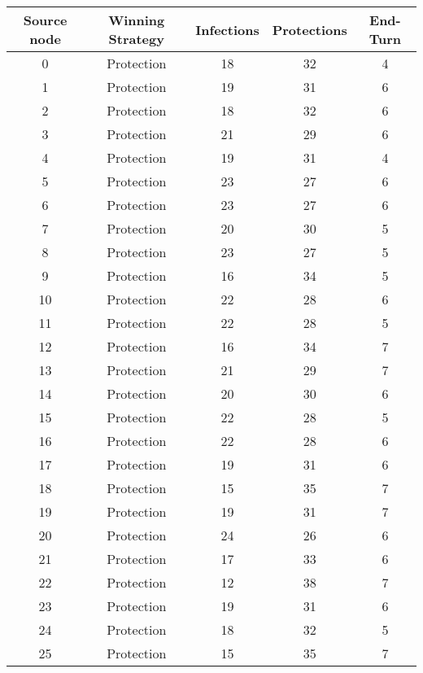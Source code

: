 \documentclass[results.tex]{subfiles}
\begin{document}
\begin{center}
  \begin{tabular}{| c || c | c | c | c |}
    \hline
    {\bfseries Source node} & {\bfseries Winning Strategy} & {\bfseries Infections} & {\bfseries Protections} & {\bfseries End-Turn} \\  %
    \hline\hline
    0 & Protection & 18 & 32 & 4 \\ 
    \hline
    1 & Protection & 19 & 31 & 6 \\ 
    \hline
    2 & Protection & 18 & 32 & 6 \\ 
    \hline
    3 & Protection & 21 & 29 & 6 \\ 
    \hline
    4 & Protection & 19 & 31 & 4 \\ 
    \hline
    5 & Protection & 23 & 27 & 6 \\ 
    \hline
    6 & Protection & 23 & 27 & 6 \\ 
    \hline
    7 & Protection & 20 & 30 & 5 \\ 
    \hline
    8 & Protection & 23 & 27 & 5 \\ 
    \hline
    9 & Protection & 16 & 34 & 5 \\ 
    \hline
    10 & Protection & 22 & 28 & 6 \\ 
    \hline
    11 & Protection & 22 & 28 & 5 \\ 
    \hline
    12 & Protection & 16 & 34 & 7 \\ 
    \hline
    13 & Protection & 21 & 29 & 7 \\ 
    \hline
    14 & Protection & 20 & 30 & 6 \\ 
    \hline
    15 & Protection & 22 & 28 & 5 \\ 
    \hline
    16 & Protection & 22 & 28 & 6 \\ 
    \hline
    17 & Protection & 19 & 31 & 6 \\ 
    \hline
    18 & Protection & 15 & 35 & 7 \\ 
    \hline
    19 & Protection & 19 & 31 & 7 \\ 
    \hline
    20 & Protection & 24 & 26 & 6 \\ 
    \hline
    21 & Protection & 17 & 33 & 6 \\ 
    \hline
    22 & Protection & 12 & 38 & 7 \\ 
    \hline
    23 & Protection & 19 & 31 & 6 \\ 
    \hline
    24 & Protection & 18 & 32 & 5 \\ 
    \hline
    25 & Protection & 15 & 35 & 7 \\ 

\end{tabular}
\end{center}
\end{document}

